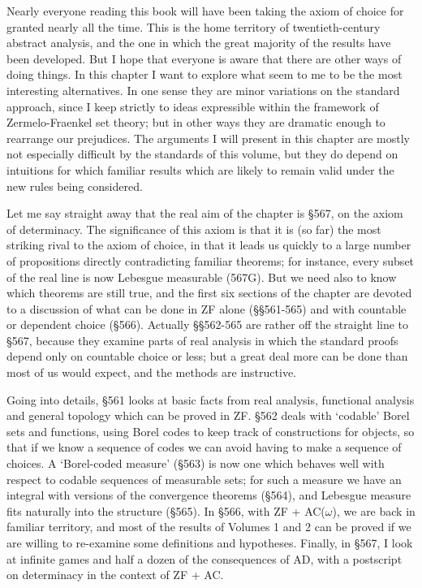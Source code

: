  
\def\chaptername{Choice and determinacy} 
 
 
Nearly everyone reading this 
book will have been taking the axiom of choice for granted nearly all the 
time.   This is the home territory of twentieth-century abstract analysis, 
and the one in which the great majority of the results 
have been developed. 
But I hope that everyone is aware that there are other ways of doing 
things.   In this chapter I want to explore what seem to me to be the most 
interesting alternatives.   In one sense they are minor variations on the 
standard approach, since I keep strictly to ideas expressible  
within the framework of Zermelo-Fraenkel set theory;  but in other ways 
they are dramatic enough to rearrange our prejudices. 
The arguments I will present in this chapter are mostly not  
especially difficult by the 
standards of this volume, but they do depend on intuitions for 
which familiar results which are likely to remain valid under the new 
rules being considered.    
 
Let me say straight away that the real aim of the chapter is \S567, on 
the axiom of determinacy. 
The significance of this axiom is that it is (so far) the most striking 
rival to the axiom of choice, in that it leads us quickly to a large number 
of propositions directly contradicting familiar theorems;  for instance, 
every subset of the real line is now Lebesgue measurable (567G).   But we 
need also to know which theorems are still true, and the first six sections 
of the chapter are devoted to a discussion of what can be done in ZF alone 
(\S\S561-565) and with countable or dependent choice (\S566).   Actually 
\S\S562-565 are rather off the straight line to \S567, because they examine 
parts of real analysis in which the standard proofs depend only on 
countable choice or less;  but a great deal more can be done than most of 
us would expect, and the methods are instructive. 
 
Going into details, \S561 looks at basic facts from real analysis, 
functional analysis and general topology which can be proved in ZF.   \S562 
deals with `codable' Borel sets and functions, using Borel codes to keep 
track of constructions for objects, so that if we know a sequence of  
codes we can avoid having to make a sequence of choices.   A `Borel-coded 
measure' (\S563) is now one which behaves well with  
respect to codable sequences of 
measurable sets;  for such a measure we have an integral with 
versions of the convergence theorems (\S564), and Lebesgue measure fits 
naturally into the structure (\S565).   In \S566, with ZF + AC($\omega$), 
we are back in familiar territory, and most of the results of Volumes 1 and 
2 can be proved if we are willing to re-examine some definitions and 
hypotheses.   Finally, in \S567, I look at infinite games and half a dozen 
of the consequences of AD, with a postscript on determinacy in the context 
of ZF + AC. 
 
\discrpage 
 

